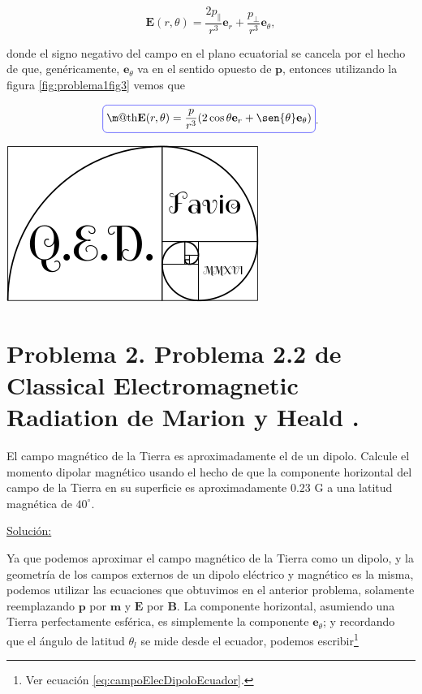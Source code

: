 \documentclass[a4paper,11pt]{article}
\makeatletter
\numberwithin{equation}{section}
\newcommand*{\boxcolor}{blue}
\renewcommand{\boxed}[1]{\textcolor{\boxcolor}{%
\tikz[baseline={([yshift=-1ex]current bounding box.center)}] \node [rectangle, minimum width=1ex,rounded corners,draw] {\normalcolor\m@th$\displaystyle#1$};}}
\makeatother
\begin{document}
\begin{equation}
 \mathbf{E}(r,\theta) = \frac{2p_\parallel}{r^3} \mathbf{e}_r + 
 \frac{p_\bot}{r^3}\mathbf{e}_\theta,
\end{equation}

donde el signo negativo del campo en el plano ecuatorial se cancela por el hecho de 
que, genéricamente, $\mathbf{e}_\theta$ va en el sentido opuesto de $\mathbf{p}$, 
entonces utilizando la figura \eqref{fig:problema1fig3} vemos que 

\begin{equation}
 \boxed{\mathbf{E}(r,\theta) = \frac{p}{r^3}(2\cos{\theta}\mathbf{e}_r + 
 \sen{\theta}\mathbf{e}_\theta)}.
\end{equation}

\hspace{10cm}\includegraphics[scale=0.25]{logoQED}

\section{Problema 2. Problema 2.2 de Classical Electromagnetic Radiation
de Marion y Heald \cite{marion2}.}

El campo magnético de la Tierra es aproximadamente el de un dipolo. Calcule el momento 
dipolar magnético usando el hecho de que la componente horizontal del campo de la 
Tierra en su superficie es aproximadamente $0.23$ G a una latitud magnética de 
$40^\circ$.

\vspace{.3cm}

\underline{Solución:} \vspace{.3cm}

Ya que podemos aproximar el campo magnético de la Tierra como un dipolo, y la geometría
de los campos externos de un dipolo eléctrico y magnético es la misma, podemos utilizar 
las ecuaciones que obtuvimos en el anterior problema, solamente reemplazando $\mathbf{p}$ 
por $\mathbf{m}$ y $\mathbf{E}$ por $\mathbf{B}$. La componente horizontal, asumiendo 
una Tierra perfectamente esférica, es simplemente la componente $\mathbf{e}_\theta$; 
y recordando que el ángulo de latitud $\theta_l$ se mide desde el ecuador, podemos 
escribir\footnote{Ver ecuación \eqref{eq:campoElecDipoloEcuador}.}
\end{document}
